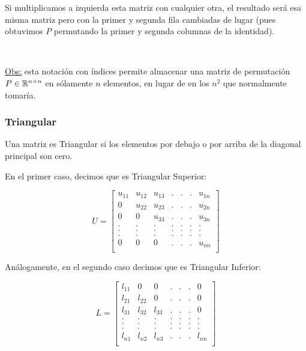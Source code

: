 Si multiplicamos a izquierda esta matriz con cualquier otra, el resultado será esa misma matriz pero con la primer y segunda fila cambiadas de lugar (pues obtuvimos $P$ permutando la primer y segunda columnas de la identidad).

~\newline

\underline{Obs:} esta notación con índices permite almacenar una matriz de permutación $P\in\mathbb{R}^{n\times n}$ en sólamente $n$ elementos, en lugar de en los $n^2$ que normalmente tomaría.

\subsubsection{Triangular}
Una matriz es Triangular si los elementos por debajo o por arriba de la diagonal principal son cero.

En el primer caso, decimos que es Triangular Superior:

\begin{equation*}
	U =
	\left [ \begin{array}{ccccccc}
	  u_{11} & u_{12} & u_{13} & . & . & .& u_{1n}\\
	  0 & u_{22} & u_{23} & . & . & .& u_{2n}\\
	  0 & 0 & u_{33} & . & . & .& u_{3n}\\
	. & . & . & . & . & .& .\\
	. & . & . & . & . & .& .\\
	. & . & . & . & . & .& .\\
	0 & 0 & 0 & . & . & .& u_{nn}\\
	\end{array} \right ]
\end{equation*}

Análogamente, en el segundo caso decimos que es Triangular Inferior:

\begin{equation*}
	L =
	\left [ \begin{array}{ccccccc}
	  l_{11} & 0 & 0 & . & . & .& 0\\
	  l_{21} & l_{22} & 0 & . & . & .& 0\\
	  l_{31} & l_{32} & l_{33} & . & . & .& 0\\
	. & . & . & . & . & .& .\\
	. & . & . & . & . & .& .\\
	. & . & . & . & . & .& .\\
	l_{n1} & l_{n2} & l_{n3} & . & . & .& l_{nn}\\
	\end{array} \right ]
\end{equation*}

